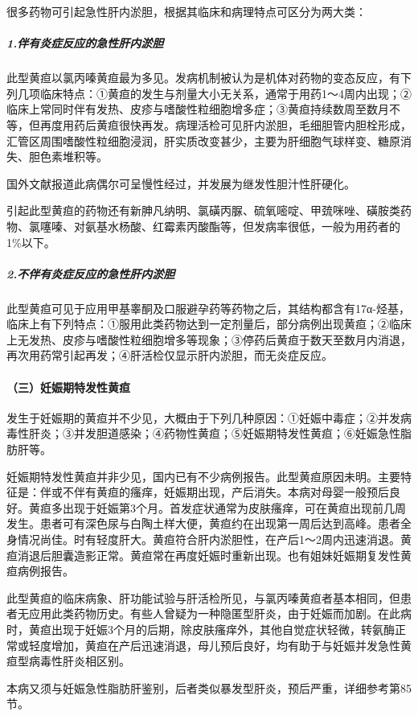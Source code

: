 很多药物可引起急性肝内淤胆，根据其临床和病理特点可区分为两大类：

\subparagraph{1.伴有炎症反应的急性肝内淤胆}

此型黄疸以氯丙嗪黄疸最为多见。发病机制被认为是机体对药物的变态反应，有下列几项临床特点：①黄疸的发生与剂量大小无关系，通常于用药1～4周内出现；②临床上常同时伴有发热、皮疹与嗜酸性粒细胞增多症；③黄疸持续数周至数月不等，但再度用药后黄疸很快再发。病理活检可见肝内淤胆，毛细胆管内胆栓形成，汇管区周围嗜酸性粒细胞浸润，肝实质改变甚少，主要为肝细胞气球样变、糖原消失、胆色素堆积等。

国外文献报道此病偶尔可呈慢性经过，并发展为继发性胆汁性肝硬化。

引起此型黄疸的药物还有新胂凡纳明、氯磺丙脲、硫氧嘧啶、甲巯咪唑、磺胺类药物、氯噻嗪、对氨基水杨酸、红霉素丙酸酯等，但发病率很低，一般为用药者的1\%以下。

\subparagraph{2.不伴有炎症反应的急性肝内淤胆}

此型黄疸可见于应用甲基睾酮及口服避孕药等药物之后，其结构都含有17α-烃基，临床上有下列特点：①服用此类药物达到一定剂量后，部分病例出现黄疸；②临床上无发热、皮疹与嗜酸性粒细胞增多等现象；③停药后黄疸于数天至数月内消退，再次用药常引起再发；④肝活检仅显示肝内淤胆，而无炎症反应。

\paragraph{（三）妊娠期特发性黄疸}

发生于妊娠期的黄疸并不少见，大概由于下列几种原因：①妊娠中毒症；②并发病毒性肝炎；③并发胆道感染；④药物性黄疸；⑤妊娠期特发性黄疸；⑥妊娠急性脂肪肝等。

妊娠期特发性黄疸并非少见，国内已有不少病例报告。此型黄疸原因未明。主要特征是：伴或不伴有黄疸的瘙痒，妊娠期出现，产后消失。本病对母婴一般预后良好。黄疸多出现于妊娠第3个月。首发症状通常为皮肤瘙痒，可在黄疸出现前几周发生。患者可有深色尿与白陶土样大便，黄疸约在出现第一周后达到高峰。患者全身情况尚佳。时有轻度肝大。黄疸符合肝内淤胆性，在产后1～2周内迅速消退。黄疸消退后胆囊造影正常。黄疸常在再度妊娠时重新出现。也有姐妹妊娠期复发性黄疸病例报告。

此型黄疸的临床病象、肝功能试验与肝活检所见，与氯丙嗪黄疸者基本相同，但患者无应用此类药物历史。有些人曾疑为一种隐匿型肝炎，由于妊娠而加剧。在此病时，黄疸出现于妊娠3个月的后期，除皮肤瘙痒外，其他自觉症状轻微，转氨酶正常或轻度增加，黄疸在产后迅速消退，母儿预后良好，均有助于与妊娠并发急性黄疸型病毒性肝炎相区别。

本病又须与妊娠急性脂肪肝鉴别，后者类似暴发型肝炎，预后严重，详细参考第85节。

